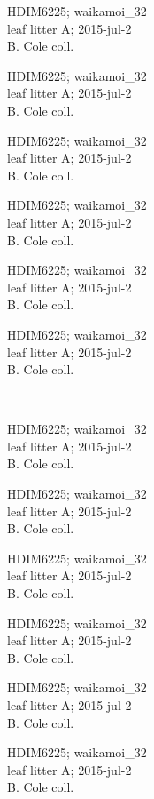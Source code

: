 \documentclass[2pt]{extarticle}
\begin{document}
\noindent
\parbox{0.16\textwidth}{\tiny \raggedright \rule[-0.3\baselineskip]{0pt}{10pt}HDIM6225; waikamoi\_32\\ leaf litter A; 2015-jul-2\\ B. Cole coll.}
\parbox{0.16\textwidth}{\tiny \raggedright \rule[-0.3\baselineskip]{0pt}{10pt}HDIM6225; waikamoi\_32\\ leaf litter A; 2015-jul-2\\ B. Cole coll.}
\parbox{0.16\textwidth}{\tiny \raggedright \rule[-0.3\baselineskip]{0pt}{10pt}HDIM6225; waikamoi\_32\\ leaf litter A; 2015-jul-2\\ B. Cole coll.}
\parbox{0.16\textwidth}{\tiny \raggedright \rule[-0.3\baselineskip]{0pt}{10pt}HDIM6225; waikamoi\_32\\ leaf litter A; 2015-jul-2\\ B. Cole coll.}
\parbox{0.16\textwidth}{\tiny \raggedright \rule[-0.3\baselineskip]{0pt}{10pt}HDIM6225; waikamoi\_32\\ leaf litter A; 2015-jul-2\\ B. Cole coll.}
\parbox{0.16\textwidth}{\tiny \raggedright \rule[-0.3\baselineskip]{0pt}{10pt}HDIM6225; waikamoi\_32\\ leaf litter A; 2015-jul-2\\ B. Cole coll.} \\ 
\vspace{0.001in} 

\noindent
\parbox{0.16\textwidth}{\tiny \raggedright \rule[-0.3\baselineskip]{0pt}{10pt}HDIM6225; waikamoi\_32\\ leaf litter A; 2015-jul-2\\ B. Cole coll.}
\parbox{0.16\textwidth}{\tiny \raggedright \rule[-0.3\baselineskip]{0pt}{10pt}HDIM6225; waikamoi\_32\\ leaf litter A; 2015-jul-2\\ B. Cole coll.}
\parbox{0.16\textwidth}{\tiny \raggedright \rule[-0.3\baselineskip]{0pt}{10pt}HDIM6225; waikamoi\_32\\ leaf litter A; 2015-jul-2\\ B. Cole coll.}
\parbox{0.16\textwidth}{\tiny \raggedright \rule[-0.3\baselineskip]{0pt}{10pt}HDIM6225; waikamoi\_32\\ leaf litter A; 2015-jul-2\\ B. Cole coll.}
\parbox{0.16\textwidth}{\tiny \raggedright \rule[-0.3\baselineskip]{0pt}{10pt}HDIM6225; waikamoi\_32\\ leaf litter A; 2015-jul-2\\ B. Cole coll.}
\parbox{0.16\textwidth}{\tiny \raggedright \rule[-0.3\baselineskip]{0pt}{10pt}HDIM6225; waikamoi\_32\\ leaf litter A; 2015-jul-2\\ B. Cole coll.} \\ 
\vspace{0.001in} 
\end{document}

